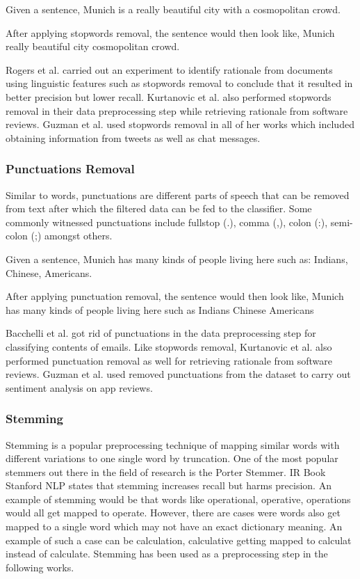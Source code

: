 \documentclass[a4paper,12pt,twoside]{report}
\begin{document}
Given a sentence, 
Munich is a really beautiful city with a cosmopolitan crowd. 

After applying stopwords removal, the sentence would then look like,
Munich really beautiful city cosmopolitan crowd.

Rogers et al. carried out an experiment to identify rationale from documents using linguistic features such as stopwords removal to conclude that it resulted in better precision but lower recall. Kurtanovic et al. also performed stopwords removal in their data preprocessing step while retrieving rationale from software reviews. Guzman et al. used stopwords removal in all of her works which included obtaining information from tweets as well as chat messages.

\subsubsection{Punctuations Removal}
Similar to words, punctuations are different parts of speech that can be removed from text after which the filtered data can be fed to the classifier. Some commonly witnessed punctuations include fullstop (.), comma (,), colon (:), semi-colon (;) amongst others. 

Given a sentence, 
Munich has many kinds of people living here such as: Indians, Chinese, Americans. 

After applying punctuation removal, the sentence would then look like,
Munich has many kinds of people living here such as Indians Chinese Americans

Bacchelli et al. got rid of punctuations in the data preprocessing step for classifying contents of emails. Like stopwords removal, Kurtanovic et al. also performed punctuation removal as well for retrieving rationale from software reviews. Guzman et al. used removed punctuations from the dataset to carry out sentiment analysis on app reviews. 

\subsubsection{Stemming}
Stemming is a popular preprocessing technique of mapping similar words with different variations to one single word by truncation. One of the most popular stemmers out there in the field of research is the Porter Stemmer. IR Book Stanford NLP states that stemming increases recall but harms precision. An example of stemming would be that words like operational, operative, operations would all get mapped to operate. However, there are cases were words also get mapped to a single word which may not have an exact dictionary meaning. An example of such a case can be calculation, calculative getting mapped to calculat instead of calculate. Stemming has been used as a preprocessing step in the following works. 
\end{document}
